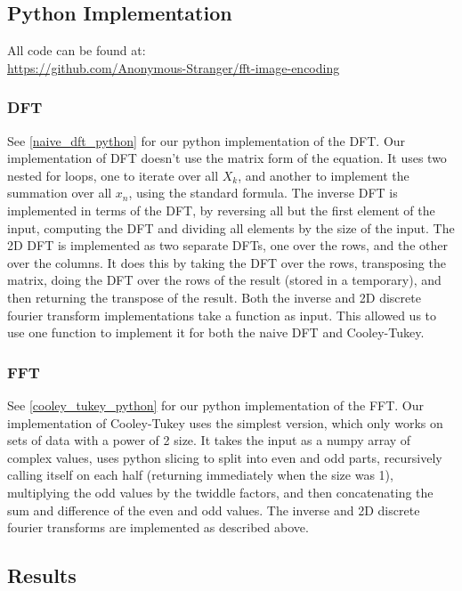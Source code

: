 \subsection{Python Implementation}
	All code can be found at: \\ \href{https://github.com/Anonymous-Stranger/fft-image-encoding}{https://github.com/Anonymous-Stranger/fft-image-encoding}
	\subsubsection{DFT}
		See \ref{naive_dft_python} for our python implementation of the DFT. Our implementation of DFT doesn't use the matrix form of the equation. It uses two nested for loops, one to iterate over all $X_k$, and another to implement the summation over all $x_n$, using the standard formula. The inverse DFT is implemented in terms of the DFT, by reversing all but the first element of the input, computing the DFT and dividing all elements by the size of the input. The 2D DFT is implemented as two separate DFTs, one over the rows, and the other over the columns. It does this by taking the DFT over the rows, transposing the matrix, doing the DFT over the rows of the result (stored in a temporary), and then returning the transpose of the result. Both the inverse and 2D discrete fourier transform implementations take a function as input. This allowed us to use one function to implement it for both the naive DFT and Cooley-Tukey.
	\subsubsection{FFT}
		See \ref{cooley_tukey_python} for our python implementation of the FFT. Our implementation of Cooley-Tukey uses the simplest version, which only works on sets of data with a power of 2 size. It takes the input as a numpy array of complex values, uses python slicing to split into even and odd parts, recursively calling itself on each half (returning immediately when the size was 1), multiplying the odd values by the twiddle factors, and then concatenating the sum and difference of the even and odd values. The inverse and 2D discrete fourier transforms are implemented as described above.
\subsection{Results}
